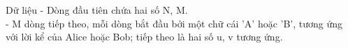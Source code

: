 Dữ liệu
- Dòng đầu tiên chứa hai số N, M.   
\\   - M dòng tiếp theo, mỗi dòng bắt đầu bởi một chữ cái 'A' hoặc 'B', tương ứng với lời kể của Alice hoặc Bob; tiếp theo là hai số u, v tương ứng.